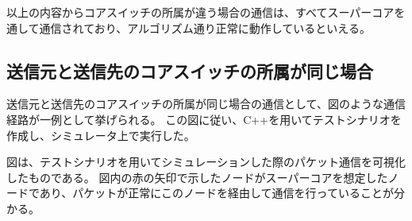 以上の内容からコアスイッチの所属が違う場合の通信は、すべてスーパーコアを通して通信されており、アルゴリズム通り正常に動作しているといえる。

\subsection{送信元と送信先のコアスイッチの所属が同じ場合}

送信元と送信先のコアスイッチの所属が同じ場合の通信として、図のような通信経路が一例として挙げられる。
この図に従い、C++を用いてテストシナリオを作成し、シミュレータ上で実行した。



図は、テストシナリオを用いてシミュレーションした際のパケット通信を可視化したものである。
図内の赤の矢印で示したノードがスーパーコアを想定したノードであり、パケットが正常にこのノードを経由して通信を行っていることが分かる。

\begin{comment}
\begin{figure}[tb]
\begin{center}
\begin{tabular}{c}

\begin{minipage}{0.4\hsize}
\begin{center}
\texttt{[image: ./lena.eps]}
\hspace{1.6cm} [1]通常画像
\end{center}
\end{minipage}

\begin{minipage}{0.4\hsize}
\begin{center}
\texttt{[image: ./lena-affine.eps]}
\hspace{1.6cm} [2]アフィン変換(90度回転)
\end{center}
\end{minipage}

\end{tabular}
\caption{画像の変換例}
\label{fig:4-3}
\end{center}
\end{figure}
\end{comment}


